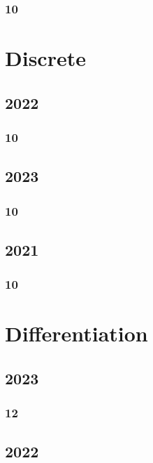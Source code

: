 \documentclass[11pt]{book}
\begin{document}
\subsection{10}

%
%
%

\chapter{Discrete}
\section{2022}
\subsection{10}

\section{2023}
\subsection{10}

\section{2021}
\subsection{10}



\chapter{Differentiation}
\section{2023}
\subsection{12}


\section{2022}
\end{document}
